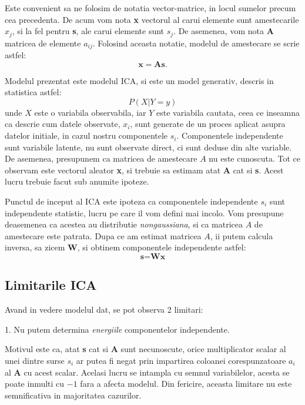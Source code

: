 \documentclass[12pt]{article}
\begin{document}
Este convenient sa ne folosim de notatia vector-matrice, in locul sumelor precum cea precedenta. De acum vom nota \textbf{x} vectorul al carui elemente sunt amestecarile $x_j$, si la fel pentru \textbf{s}, ale carui elemente sunt $s_j$. De asemenea, vom nota \textbf{A} matricea de elemente $a_{ij}$. Folosind aceasta notatie, modelul de amestecare se scrie astfel:
\begin{equation}
	\textbf{x}=\textbf{As}.
\end{equation}

Modelul prezentat este modelul ICA, si este un model generativ, descris in statistica astfel:
\begin{equation}
	P(X|Y=y) 
\end{equation}
unde $X$ este o variabila observabila, iar $Y$ este variabila cautata, ceea ce inseamna ca descrie cum datele observate, $x_i$, sunt generate de un proces aplicat asupra datelor initiale, in cazul nostru componentele $s_i$. Componentele independente sunt variabile latente, nu sunt observate direct, ci sunt deduse din alte variable. De asemenea, presupunem ca matricea de amestecare $A$ nu este cunoscuta. Tot ce observam este vectorul aleator \textbf{x}, si trebuie sa estimam atat \textbf{A} cat si \textbf{s}. Acest lucru trebuie facut sub anumite ipoteze.

Punctul de inceput al ICA este ipoteza ca componentele independente $s_i$ sunt independente statistic, lucru pe care il vom defini mai incolo. Vom presupune deasemenea ca acestea au distributie \textit{nongaussiana}, si ca matricea $A$ de amestecare este patrata. Dupa ce am estimat matricea $A$, ii putem calcula inversa, sa zicem \textbf{W}, si obtinem componentele independente astfel:
\begin{equation}
\textbf{s}=\textbf{Wx}
\end{equation}

\subsection{Limitarile ICA}
Avand in vedere modelul dat, se pot observa 2 limitari:

1. Nu putem determina \textit{energiile} componentelor independente.

Motivul este ca, atat \textbf{s} cat si \textbf{A} sunt necunoscute, orice multiplicator scalar al unei dintre surse $s_i$ ar putea fi negat prin impartirea coloanei corespunzatoare $a_i$ al \textbf{A} cu acest scalar. Acelasi lucru se intampla cu semnul variabilelor, acesta se poate inmulti cu $-1$ fara a afecta modelul. Din fericire, aceasta limitare nu este semnificativa in majoritatea cazurilor.
\end{document}

